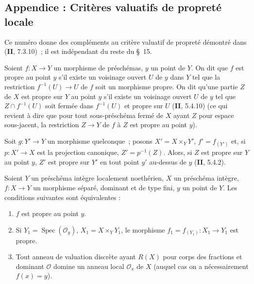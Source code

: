 
\subsection{Appendice : Critères valuatifs de propreté locale}
\label{subsection:IV.15.7-fr}

Ce numéro donne des compléments au critère valuatif de propreté démontré dans (\textbf{II}, 7.3.10)~; il est indépendant du reste du \S~15.

\begin{definition}[15.7.1]
\label{IV.15.7.1-fr}
Soient $f:X\to Y$ un morphisme de préschémas, $y$ un point de $Y$. On dit que $f$ est propre au point $y$ s'il existe un voisinage ouvert $U$ de $y$ dans $Y$ tel que la restriction $f^{-1}(U)\to U$ de $f$ soit un morphisme propre. On dit qu'une partie $Z$ de $X$ est propre sur $Y$ au point $y$ s'il existe un voisinage ouvert $U$ de $y$ tel que $Z\cap f^{-1}(U)$ soit fermée dans $f^{-1}(U)$ et propre sur $U$ (\textbf{II}, 5.4.10) (ce qui revient à dire que pour tout sous-préschéma fermé de $X$ ayant $Z$ pour espace sous-jacent, la restriction $Z\to Y$ de $f$ à $Z$ est propre au point $y$).
\end{definition}

Soit $g:Y'\to Y$ un morphisme quelconque~; posons $X'=X\times_Y Y'$, $f'=f_{(Y')}$ et, si $p:X'\to X$ est la projection canonique, $Z'=p^{-1}(Z)$. Alors, si $Z$ est propre sur $Y$ au point $y$, $Z'$ est propre sur $Y'$ en tout point $y'$ au-dessus de $y$ (\textbf{II}, 5.4.2).

\begin{proposition}[15.7.2]
\label{IV.15.7.2-fr}
Soient $Y$ un préschéma intègre localement noethérien, $X$ un préschéma intègre, $f:X\to Y$ un morphisme séparé, dominant et de type fini, $y$ un point de $Y$. Les conditions suivantes sont équivalentes :
\begin{enumerate}[label=\emph{\alph*)}]
  \item $f$ est propre au point $y$.
  \item Si $Y_1=\operatorname{Spec}(\mathcal O_y)$, $X_1=X\times_Y Y_1$, le morphisme $f_1=f_{(Y_1)}:X_1\to Y_1$ est propre.
  \item Tout anneau de valuation discrète ayant $R(X)$ pour corps des fractions et dominant $\mathcal O$ domine un anneau local $\mathcal O_x$ de $X$ (auquel cas on a nécessairement $f(x)=y$).
\end{enumerate}
\end{proposition}

